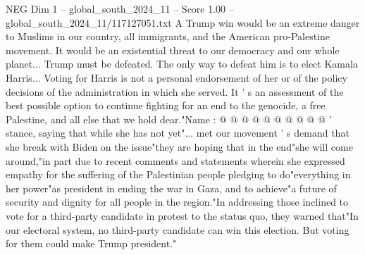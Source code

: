 \begin{textsample}{NEG Dim 1 – global\_south\_2024\_11 – Score 1.00 – global\_south\_2024\_11/117127051.txt}
A Trump win would be an extreme danger to Muslims in our country, all immigrants, and the American pro-Palestine movement.
It would be an existential threat to our democracy and our whole planet...
Trump must be defeated.
The only way to defeat him is to elect Kamala Harris...
Voting for Harris is not a personal endorsement of her or of the policy decisions of the administration in which she served.
It ' s an assessment of the best possible option to continue fighting for an end to the genocide, a free Palestine, and all else that we hold dear."Name : @ @ @ @ @ @ @ @ @ @ ' stance, saying that while she has not yet"... met our movement ' s demand that she break with Biden on the issue"they are hoping that in the end"she will come around,"in part due to recent comments and statements wherein she expressed empathy for the suffering of the Palestinian people pledging to do"everything in her power"as president in ending the war in Gaza, and to achieve"a future of security and dignity for all people in the region."In addressing those inclined to vote for a third-party candidate in protest to the status quo, they warned that"In our electoral system, no third-party candidate can win this election.
But voting for them could make Trump president."

\end{textsample}
